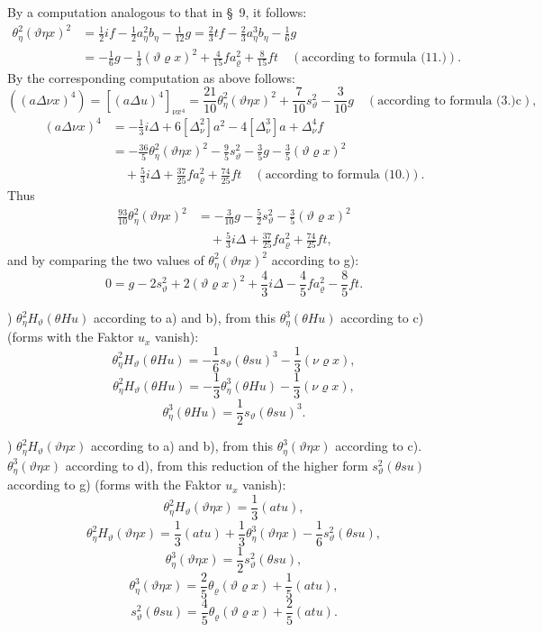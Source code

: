\documentclass[11pt]{article}
\newcommand{\A}{\Delta}
\newcommand{\R}{\varrho}
\begin{document}
By a computation analogous to that in \S\ 9, it follows:
\[
\begin{aligned}
\theta_\eta^2(\vartheta\eta x)^2
&=\frac12 i f-\frac12a_\eta^2b_\eta-\frac1{12}g
=\frac23tf-\frac23a_\eta^3b_\eta-\frac16g\\
&=-\frac16g-\frac13(\vartheta\R x)^2+\frac4{15}fa_\R^2+\frac8{15}ft
\quad(\text{according to formula (11.)}).
\end{aligned}
\]
By the corresponding computation as above follows:
\[
((a\A\nu x)^4)=[(a\A u)^4]_{\nu x^4}
=\frac{21}{10}\theta_\eta^2(\vartheta\eta x)^2+\frac7{10}s_\vartheta^2-\frac3{10}g
\quad(\text{according to formula (3.)c}),
\]
\[
\begin{aligned}
(a\A\nu x)^4&=-\frac13i\A+6[\A_\nu^2]a^2-4[\A_\nu^3]a+\A_\nu^4f\\
&= -\frac{36}{5}\theta_\eta^2(\vartheta\eta x)^2-\frac95s_\vartheta^2-\frac35g-\frac35(\vartheta\R x)^2\\
&\quad+\frac53i\A+\frac{37}{25}fa_\R^2+\frac{74}{25}ft\quad(\text{according to formula (10.)}).
\end{aligned}
\]
Thus
\[
\begin{aligned}
\frac{93}{10}\theta_\eta^2(\vartheta\eta x)^2
&=-\frac3{10}g-\frac52s_\vartheta^2-\frac35(\vartheta\R x)^2\\
&\quad+\frac53i\A+\frac{37}{25}fa_\R^2+\frac{74}{25}ft,
\end{aligned}
\]
and by comparing the two values of $\theta_\eta^2(\vartheta\eta x)^2$ according to g):
\[
\tag{13}
0=g-2s_\vartheta^2+2(\vartheta\R x)^2+\frac43i\A-\frac45fa_\R^2-\frac85ft.
\]

) $\theta_\eta^2H_\vartheta(\theta Hu)$ according to a) and b), from this $\theta_\eta^3(\theta Hu)$ according to c) (forms with the Faktor $u_x$ vanish):
\[
\theta_\eta^2H_\vartheta(\theta Hu)=-\frac16s_\vartheta(\theta su)^3-\frac13(\nu\R x),
\]
\[
\theta_\eta^2H_\vartheta(\theta Hu)=-\frac13\theta_\eta^3(\theta Hu)-\frac13(\nu\R x),
\]
\[
\theta_\eta^3(\theta Hu)=\frac12s_\vartheta(\theta su)^3.
\]

) $\theta_\eta^2H_\vartheta(\vartheta\eta x)$ according to a) and b), from this $\theta_\eta^3(\vartheta\eta x)$ according to c). $\theta_\eta^3(\vartheta\eta x)$ according to d), from this reduction of the higher form $s_\vartheta^2(\theta su)$ according to g) (forms with the Faktor $u_x$ vanish):
\[
\theta_\eta^2H_\vartheta(\vartheta\eta x)=\frac13(atu),
\]
\[
\theta_\eta^2H_\vartheta(\vartheta\eta x)=\frac13(atu)+\frac13\theta_\eta^3(\vartheta\eta x)-\frac16s_\vartheta^2(\theta su),
\]
\[
\theta_\eta^3(\vartheta\eta x)=\frac12s_\vartheta^2(\theta su),
\]
\[
\theta_\eta^3(\vartheta\eta x)=\frac25\theta_\R(\vartheta\R x)+\frac15(atu),
\]
\[
\tag{14}
s_\vartheta^2(\theta su)=\frac45\theta_\R(\vartheta\R x)+\frac25(atu).
\]
\end{document}
